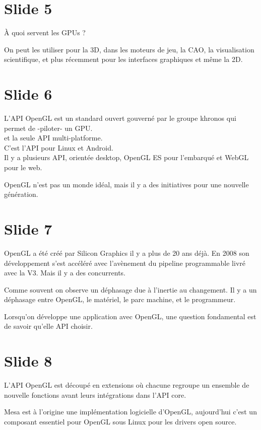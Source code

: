 \documentclass[12pt]{article}
\begin{document}
\section{Slide 5}

À quoi servent les GPUs ?

On peut les utiliser pour la 3D, dans les moteurs de jeu, la CAO, la visualisation scientifique, et
plus récemment pour les interfaces graphiques et même la 2D.

\section{Slide 6}

L'API OpenGL est un standard ouvert gouverné par le groupe khronos qui permet de -piloter- un GPU. \\
et la seule API multi-platforme. \\
C'est l'API pour Linux et Android. \\
Il y a plusieurs API, orientée desktop, OpenGL ES pour l'embarqué et WebGL pour le web.

OpenGL n'est pas un monde idéal, mais il y a des initiatives pour une nouvelle génération.

\section{Slide 7}

OpenGL a été créé par Silicon Graphics il y a plus de 20 ans déjà. En 2008 son développement s'est
accéléré avec l'avènement du pipeline programmable livré avec la V3. Mais il y a des concurrents.

Comme souvent on observe un déphasage due à l'inertie au changement. Il y a un déphasage entre
OpenGL, le matériel, le parc machine, et le programmeur.

Lorsqu'on développe une application avec OpenGL, une question fondamental est de savoir qu'elle API choisir.

\section{Slide 8}

L'API OpenGL est découpé en extensions où chacune regroupe un ensemble de nouvelle fonctions avant
leurs intégrations dans l'API core.

Mesa est à l'origine une implémentation logicielle d'OpenGL, aujourd'hui c'est un composant
essentiel pour OpenGL sous Linux pour les drivers open source.
\end{document}
